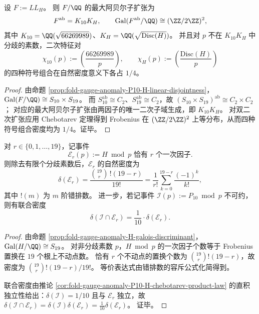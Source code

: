 \begin{corollary}[最大阿贝尔子扩张与双二次特征的等分布]\label{cor:fold-gauge-anomaly-P10-H-max-abelian-and-quadratic-equidistribution}
设 \(F:=LL_H\)。
则 \(F/\QQ\) 的最大阿贝尔子扩张为
\[
F^{\mathrm{ab}}=K_{10}K_H,
\qquad
\mathrm{Gal}(F^{\mathrm{ab}}/\QQ)\cong (\ZZ/2\ZZ)^2,
\]
其中 \(K_{10}=\QQ(\sqrt{66269989})\)、\(K_H=\QQ(\sqrt{\mathrm{Disc}(H)})\)。
并且对 \(p\) 不在 \(K_{10}K_H\) 中分歧的素数，二次特征对
\[
\chi_{10}(p):=\left(\frac{66269989}{p}\right),
\qquad
\chi_H(p):=\left(\frac{\mathrm{Disc}(H)}{p}\right)
\]
的四种符号组合在自然密度意义下各占 \(1/4\)。
\end{corollary}
\begin{proof}
由命题 \ref{prop:fold-gauge-anomaly-P10-H-linear-disjointness}，
\(\mathrm{Gal}(F/\QQ)\cong S_{10}\times S_{19}\)。
而 \(S_{10}^{\mathrm{ab}}\cong C_2\)、\(S_{19}^{\mathrm{ab}}\cong C_2\)，故
\(
(S_{10}\times S_{19})^{\mathrm{ab}}\cong C_2\times C_2
\)；
对应的最大阿贝尔子扩张由两因子的唯一二次子域生成，即 \(K_{10}K_H\)。
对双二次扩张应用 Chebotarev 定理得到 Frobenius 在 \((\ZZ/2\ZZ)^2\) 上等分布，从而四种符号组合密度均为 \(1/4\)。证毕。
\end{proof}

\begin{proposition}\label{prop:fold-gauge-anomaly-H-rencontres-fixed-point-density}
对 \(r\in\{0,1,\dots,19\}\)，记事件
\[
\mathcal E_r(p):=\text{$H\bmod p$ 恰有 \(r\) 个一次因子}.
\]
则除去有限个分歧素数后，\(\mathcal E_r\) 的自然密度为
\[
\delta(\mathcal E_r)
=\frac{\binom{19}{r}\,!(19-r)}{19!}
=\frac{1}{r!}\sum_{k=0}^{19-r}\frac{(-1)^k}{k!},
\]
其中 \(!(m)\) 为 \(m\) 阶错排数。
进一步，若记事件 \(\mathcal I(p):=\text{$P_{10}\bmod p$ 不可约}\)，则有联合密度
\[
\delta(\mathcal I\cap \mathcal E_r)=\frac1{10}\cdot \delta(\mathcal E_r).
\]
\end{proposition}
\begin{proof}
由命题 \ref{prop:fold-gauge-anomaly-H-galois-discriminant}，\(\mathrm{Gal}(H/\QQ)\cong S_{19}\)。
对非分歧素数 \(p\)，\(H\bmod p\) 的一次因子个数等于 Frobenius 置换在 \(19\) 个根上不动点数。
恰有 \(r\) 个不动点的置换个数为 \(\binom{19}{r}!(19-r)\)，故密度为 \(\binom{19}{r}!(19-r)/19!\)。
等价表达式由错排数的容斥公式化简得到。
\par
联合密度由推论 \ref{cor:fold-gauge-anomaly-P10-H-chebotarev-product-law} 的直积独立性给出：\(\delta(\mathcal I)=1/10\) 且与 \(\mathcal E_r\) 独立，故
\(
\delta(\mathcal I\cap\mathcal E_r)=\delta(\mathcal I)\delta(\mathcal E_r)=\frac1{10}\delta(\mathcal E_r)
\)。
证毕。
\end{proof}

